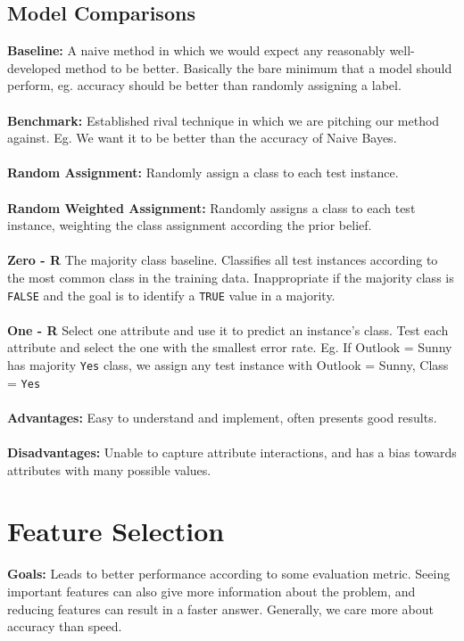 \documentclass[a4paper,10pt]{article}
\begin{document}
\subsection*{Model Comparisons}
\textcolor{Periwinkle}{\textbf{Baseline:}} A naive method in which we would expect any reasonably well-developed method to be better. Basically the bare minimum that a model should perform, eg. accuracy should be better than randomly assigning a label. \\\\
\textcolor{Periwinkle}{\textbf{Benchmark:}} Established rival technique in which we are pitching our method against. Eg. We want it to be better than the accuracy of Naive Bayes.\\\\
\textcolor{Periwinkle}{\textbf{Random Assignment:}} Randomly assign a class to each test instance.\\\\
\textcolor{Periwinkle}{\textbf{Random Weighted Assignment:}} Randomly assigns a class to each test instance, weighting the class assignment according the prior belief. \\\\
\textcolor{Periwinkle}{\textbf{Zero - R}} The majority class baseline. Classifies all test instances according to the most common class in the training data. Inappropriate if the majority class is \texttt{FALSE} and the goal is to identify a \texttt{TRUE} value in a majority. \\\\	
\textcolor{Periwinkle}{\textbf{One - R}} Select one attribute and use it to predict an instance's class. Test each attribute and select the one with the smallest error rate. Eg. If Outlook = Sunny has majority \texttt{Yes} class, we assign any test instance with Outlook = Sunny, Class = \texttt{Yes} \\\\
\textbf{Advantages:} Easy to understand and implement, often presents good results. \\\\
\textbf{Disadvantages:} Unable to capture attribute interactions, and has a bias towards attributes with many possible values. 
\section*{Feature Selection}
\textcolor{Periwinkle}{\textbf{Goals:}} Leads to better performance according to some evaluation metric. Seeing important features can also give more information about the problem, and reducing features can result in a faster answer. Generally, we care more about accuracy than speed.
\end{document}
